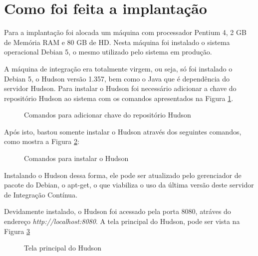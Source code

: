 \section{Como foi feita a implantação}

Para a implantação foi alocada um máquina com processador Pentium 4, 2 GB de Memória RAM e 80 GB de HD. Nesta máquina foi instalado o sistema operacional Debian 5, o mesmo utilizado pelo sistema em produção.

A máquina de integração era totalmente virgem, ou seja, só foi instalado o Debian 5, o Hudson versão 1.357, bem como o Java que é dependência do servidor Hudson. Para instalar o Hudson foi necessário adicionar a chave do repositório Hudson ao sistema com os comandos apresentados na Figura \ref{comandos_chave}.

\begin{figure}[ht]
    \centering
    \caption{Comandos para adicionar chave do repositório Hudson}
    \label{comandos_chave}
\end{figure}

Após isto, bastou somente instalar o Hudson através dos seguintes comandos, como mostra a Figura \ref{comandos_hudson}:

\begin{figure}[ht]
    \centering
    \caption{Comandos para instalar o Hudson}
    \label{comandos_hudson}
\end{figure}

Instalando o Hudson dessa forma, ele pode ser atualizado pelo gerenciador de pacote do Debian, o apt-get, o que viabiliza o uso da última versão deste servidor de Integração Contínua.

Devidamente instalado, o Hudson foi acessado pela porta 8080, atráves do endereço \textit{http://localhost:8080}. A tela principal do Hudson, pode ser vista na Figura \ref{hudson_principal}

\begin{figure}[ht]
    \centering
    \caption{Tela principal do Hudson}
    \label{hudson_principal}
\end{figure}

